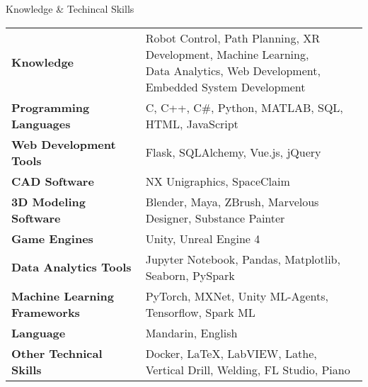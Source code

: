 \documentclass{resume} %
\begin{document}
\begin{rSection}{Knowledge \& Techincal Skills}

\begin{tabular}{ @{} >{\bfseries}l @{\hspace{6ex}} l }
Knowledge & \pbox{20cm}{Robot Control, Path Planning, XR Development, Machine Learning, 
                        \\Data Analytics, Web Development, Embedded System Development
                        } \smallskip\\

Programming Languages & C, C++, C\#, Python, MATLAB, SQL, HTML, JavaScript\\
Web Development Tools & Flask, SQLAlchemy, Vue.js, jQuery \\
CAD Software & NX Unigraphics, SpaceClaim  \\
3D Modeling Software & Blender, Maya, ZBrush, Marvelous Designer, Substance Painter\\
Game Engines & Unity, Unreal Engine 4 \\
Data Analytics Tools & Jupyter Notebook, Pandas, Matplotlib, Seaborn, PySpark\\
Machine Learning Frameworks & PyTorch, MXNet, Unity ML-Agents, Tensorflow, Spark ML\\
Language & Mandarin, English \\
Other Technical Skills & Docker, LaTeX, LabVIEW, Lathe, Vertical Drill, Welding, FL Studio, Piano
\end{tabular}

\end{rSection}





\end{document}
